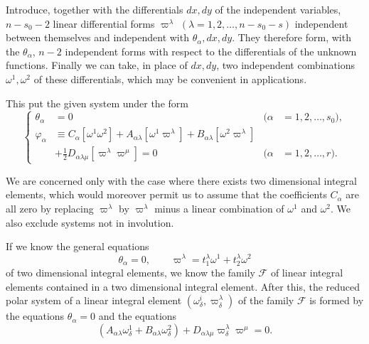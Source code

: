 \documentclass[leqno,11pt]{book}
\numberwithin{equation}{chapter}
\theoremstyle{shape1}
\theoremstyle{shape0}
\theoremstyle{shape2}
\theoremstyle{definition}
\begin{document}
Introduce, together with the differentials $dx, dy$ of the independent variables, $n-s_{0}-2$ linear differential forms $\varpi^{\lambda}$ $(\lambda=1,2,\dots,n-s_{0}-s)$ independent between themselves and independent with $\theta_{\alpha},dx,dy$. They therefore form, with the $\theta_{\alpha}$, $n-2$ independent forms with respect to the differentials of the unknown functions. Finally we can take, in place of $dx,dy$, two independent combinations $\omega^{1},\omega^{2}$ of these differentials, which may be convenient in applications.

This put the given system under the form
\begin{equation}
  \label{eq:5.2}
  \left\{
    \begin{aligned}
      \theta_{\alpha}&= 0&(\alpha&=1,2,\dots,s_{0}),\\
      \varphi_{\alpha}&\equiv C_{\alpha}[\omega^{1}\omega^{2}]+A_{\alpha\lambda}[\omega^{1}\varpi^{\lambda}]+B_{\alpha\lambda}[\omega^{2}\varpi^{\lambda}]\\
      &+\frac{1}{2}D_{\alpha\lambda\mu}[\varpi^{\lambda}\varpi^{\mu}]=0&(\alpha&=1,2,\dots,r).
    \end{aligned}
  \right.
\end{equation}

We are concerned only with the case where there exists two dimensional integral elements, which would moreover permit us to assume that the coefficients $C_{\alpha}$ are all zero by replacing $\varpi^{\lambda}$ by $\varpi^{\lambda}$ minus a linear combination of $\omega^{1}$ and $\omega^{2}$. We also exclude systems not in involution.

If we know the general equations
\begin{equation}
  \label{eq:5.3}
  \theta_{\alpha}=0,\qquad\varpi^{\lambda}=t_{1}^{\lambda}\omega^{1}+t_{2}^{\lambda}\omega^{2}
\end{equation}
of two dimensional integral elements, we know the family $\mathcal{F}$ of linear integral elements contained in a two dimensional integral element. After this, the reduced polar system of a linear integral element $(\omega^{i}_{\delta},\varpi^{\lambda}_{\delta})$ of the family $\mathcal{F}$ is formed by the equations $\theta_{\alpha}=0$ and the equations
\begin{equation}
  \label{eq:5.4}
  (A_{\alpha\lambda}\omega^{1}_{\delta}+B_{\alpha\lambda}\omega^{2}_{\delta})+D_{\alpha\lambda\mu}\varpi^{\lambda}_{\delta}\varpi^{\mu}=0.
\end{equation}
\end{document}
